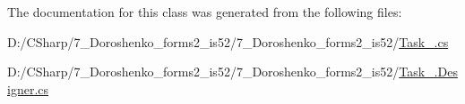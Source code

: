 The documentation for this class was generated from the following files\+:\begin{DoxyCompactItemize}
\item 
D\+:/\+C\+Sharp/7\+\_\+\+Doroshenko\+\_\+forms2\+\_\+is52/7\+\_\+\+Doroshenko\+\_\+forms2\+\_\+is52/\hyperlink{_task__2_8cs}{Task\+\_.\+cs}\item 
D\+:/\+C\+Sharp/7\+\_\+\+Doroshenko\+\_\+forms2\+\_\+is52/7\+\_\+\+Doroshenko\+\_\+forms2\+\_\+is52/\hyperlink{_task__2_8_designer_8cs}{Task\+\_.\+Designer.\+cs}\end{DoxyCompactItemize}
